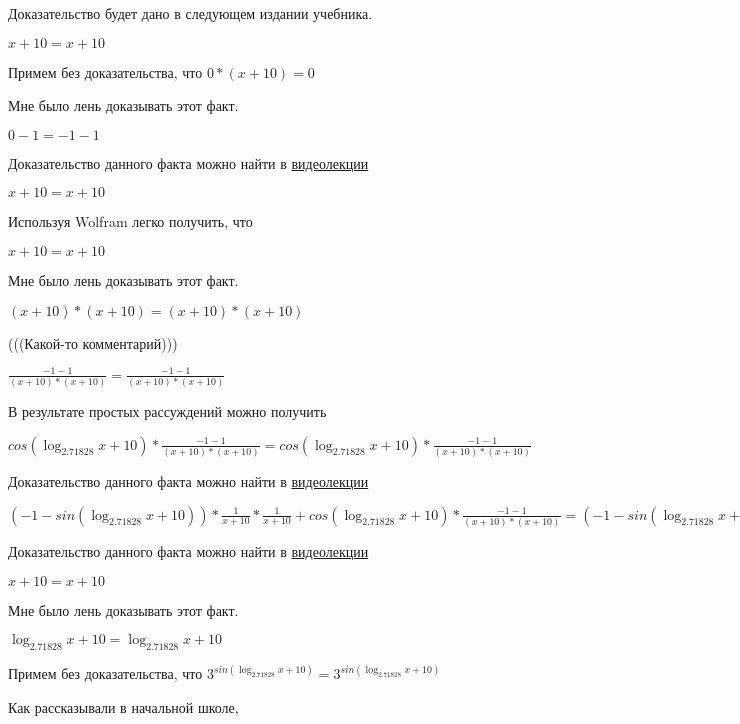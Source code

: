 \documentclass[12pt,a4paper,fleqn]{article}
\theoremstyle{definition}
\begin{document}
Доказательство будет дано в следующем издании учебника.

$ x  +  10  =  x  +  10 $

Примем без доказательства, что
$ 0  * ( x  +  10 ) =  0 $

Мне было лень доказывать этот факт.

$ 0  -  1  =  -1  -  1 $

Доказательство данного факта можно найти в \href{https://www.youtube.com/watch?v=dQw4w9WgXcQ}{видеолекции}

$ x  +  10  =  x  +  10 $

Используя Wolfram легко получить, что

$ x  +  10  =  x  +  10 $

Мне было лень доказывать этот факт.

$( x  +  10 ) * ( x  +  10 ) = ( x  +  10 ) * ( x  +  10 )$

(((Какой-то комментарий)))

$\frac{ -1  -  1 }{( x  +  10 ) * ( x  +  10 )}
 = \frac{ -1  -  1 }{( x  +  10 ) * ( x  +  10 )}
$

В результате простых рассуждений можно получить

$cos(\log_{ 2.71828 }{ x  +  10 }) * \frac{ -1  -  1 }{( x  +  10 ) * ( x  +  10 )}
 = cos(\log_{ 2.71828 }{ x  +  10 }) * \frac{ -1  -  1 }{( x  +  10 ) * ( x  +  10 )}
$

Доказательство данного факта можно найти в \href{https://www.youtube.com/watch?v=dQw4w9WgXcQ}{видеолекции}

$( -1  - sin(\log_{ 2.71828 }{ x  +  10 })) * \frac{ 1 }{ x  +  10 }
 * \frac{ 1 }{ x  +  10 }
 + cos(\log_{ 2.71828 }{ x  +  10 }) * \frac{ -1  -  1 }{( x  +  10 ) * ( x  +  10 )}
 = ( -1  - sin(\log_{ 2.71828 }{ x  +  10 })) * \frac{ 1 }{ x  +  10 }
 * \frac{ 1 }{ x  +  10 }
 + cos(\log_{ 2.71828 }{ x  +  10 }) * \frac{ -1  -  1 }{( x  +  10 ) * ( x  +  10 )}
$

Доказательство данного факта можно найти в \href{https://www.youtube.com/watch?v=dQw4w9WgXcQ}{видеолекции}

$ x  +  10  =  x  +  10 $

Мне было лень доказывать этот факт.

$\log_{ 2.71828 }{ x  +  10 } = \log_{ 2.71828 }{ x  +  10 }$

Примем без доказательства, что
${ 3 }^{sin(\log_{ 2.71828 }{ x  +  10 })} = { 3 }^{sin(\log_{ 2.71828 }{ x  +  10 })}$

Как рассказывали в начальной школе,
\end{document}
